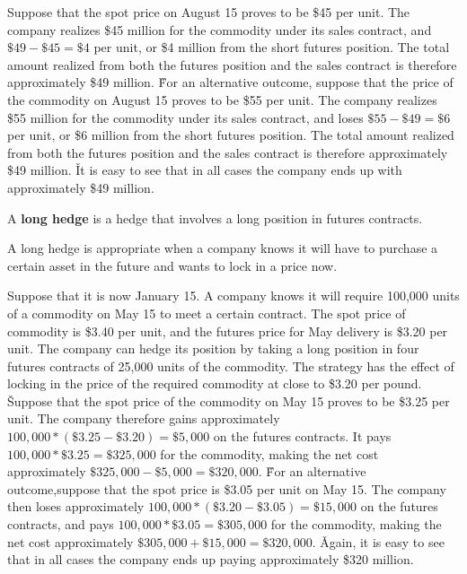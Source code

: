 Suppose that the spot price on August 15 proves to be \$45 per unit. The company realizes \$45 million for the commodity
under its sales contract, and $\$49 - \$45 = \$4$ per unit, or \$4 million from the short futures position. The total
amount realized from both the futures position and the sales contract is therefore approximately \$49 million. \v

For an alternative outcome, suppose that the price of the commodity on August 15 proves to be \$55 per unit. The company
realizes \$55 million for the commodity under its sales contract, and loses $\$55 - \$49 = \$6$ per unit, or \$6 million
from the short futures position. The total amount realized from both the futures position and the sales contract is
therefore approximately \$49 million. \v

It is easy to see that in all cases the company ends up with approximately \$49 million.
\ee

A \textbf{long hedge} is a hedge that involves a long position in futures contracts.
\ed

A long hedge is appropriate when a company knows it will have to purchase a certain asset in the future and wants to
lock in a price now.

\be
Suppose that it is now January 15. A company knows it will require 100,000 units of a commodity on May 15 to meet a
certain contract. The spot price of commodity is \$3.40 per unit, and the futures price for May delivery is \$3.20 per
unit. The company can hedge its position by taking a long position in four futures contracts of 25,000 units of the
commodity. The strategy has the effect of locking in the price of the required commodity at close to \$3.20 per pound.
\v

Suppose that the spot price of the commodity on May 15 proves to be \$3.25 per unit. The company therefore gains
approximately $100,000 * (\$3.25 - \$3.20) = \$5,000$ on the futures contracts. It pays $100,000 * \$3.25 = \$325,000$
for the commodity, making the net cost approximately $\$325,000 - \$5,000 = \$320,000$. \v

For an alternative outcome,suppose that the spot price is \$3.05 per unit on May 15. The company then loses
approximately $100,000 * (\$3.20 - \$3.05) = \$15,000$ on the futures contracts, and pays $100,000 * \$3.05 = \$305,000$
for the commodity, making the net cost approximately $\$305,000 + \$15,000 = \$320,000$. \v

Again, it is easy to see that in all cases the company ends up paying approximately \$320 million.
\ee


